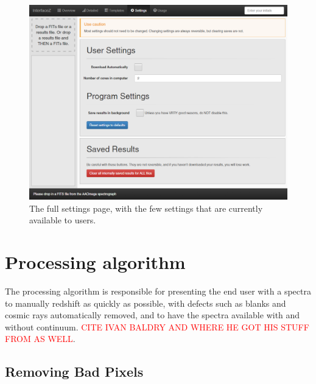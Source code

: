 \documentclass[titlesmallcaps, examinerscopy, copyrightpage]{uqthesis}
\begin{document}
\begin{figure}[ht!]
\includegraphics[width=1\textwidth]{images/settings.png} 
\centering
\caption{The full settings page, with the few settings that are currently available to users.}
\label{fig:settings}
\end{figure}


























\pagebreak
\section{Processing algorithm}

The processing algorithm is responsible for presenting the end user with a spectra to manually redshift as quickly as possible, with defects such as blanks and cosmic rays automatically removed, and to have the spectra available with and without continuum. \textcolor{red}{CITE IVAN BALDRY AND WHERE HE GOT HIS STUFF FROM AS WELL}.

\subsection{Removing Bad Pixels}
\end{document}
